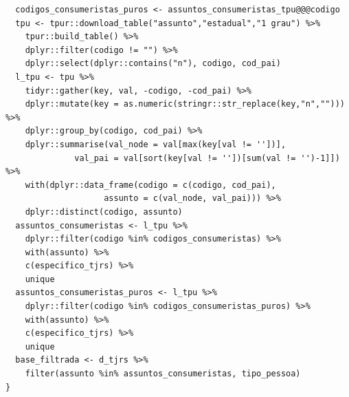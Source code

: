 \documentclass[]{report}
\begin{document}
\begin{verbatim}
  codigos_consumeristas_puros <- assuntos_consumeristas_tpu@@@codigo
  tpu <- tpur::download_table("assunto","estadual","1 grau") %>%
    tpur::build_table() %>%
    dplyr::filter(codigo != "") %>%
    dplyr::select(dplyr::contains("n"), codigo, cod_pai)
  l_tpu <- tpu %>%
    tidyr::gather(key, val, -codigo, -cod_pai) %>%
    dplyr::mutate(key = as.numeric(stringr::str_replace(key,"n",""))) %>%
    dplyr::group_by(codigo, cod_pai) %>%
    dplyr::summarise(val_node = val[max(key[val != ''])],
              val_pai = val[sort(key[val != ''])[sum(val != '')-1]]) %>%
    with(dplyr::data_frame(codigo = c(codigo, cod_pai),
                    assunto = c(val_node, val_pai))) %>%
    dplyr::distinct(codigo, assunto)
  assuntos_consumeristas <- l_tpu %>%
    dplyr::filter(codigo %in% codigos_consumeristas) %>%
    with(assunto) %>%
    c(especifico_tjrs) %>%
    unique
  assuntos_consumeristas_puros <- l_tpu %>%
    dplyr::filter(codigo %in% codigos_consumeristas_puros) %>%
    with(assunto) %>%
    c(especifico_tjrs) %>%
    unique
  base_filtrada <- d_tjrs %>%
    filter(assunto %in% assuntos_consumeristas, tipo_pessoa)
}

\end{verbatim}


\end{document}
